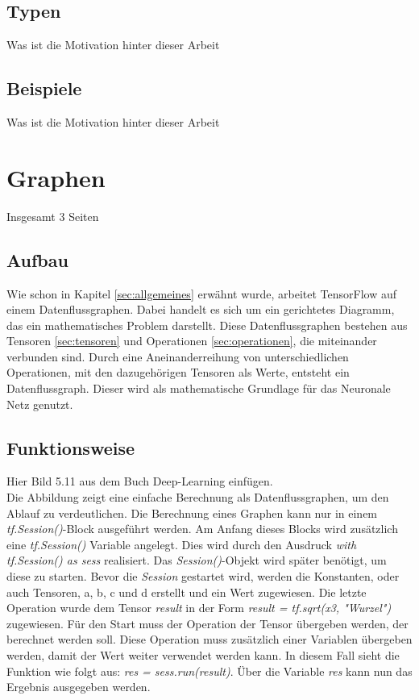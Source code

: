\subsection{Typen}
\label{sec:typen}
Was ist die Motivation hinter dieser Arbeit

\subsection{Beispiele}
\label{sec:beispiele}
Was ist die Motivation hinter dieser Arbeit

\section{Graphen}
\label{sec:graphen}
\printsubchapterauthor{\authorNiklas}
Insgesamt 3 Seiten

\subsection{Aufbau}
\label{sec:graphenAufbau}

Wie schon in Kapitel \ref{sec:allgemeines} erwähnt wurde, arbeitet TensorFlow auf einem Datenflussgraphen. Dabei handelt es sich um ein gerichtetes Diagramm, das ein mathematisches Problem darstellt. Diese Datenflussgraphen bestehen aus Tensoren \ref{sec:tensoren} und Operationen \ref{sec:operationen}, die miteinander verbunden sind. Durch eine Aneinanderreihung von unterschiedlichen Operationen, mit den dazugehörigen Tensoren als Werte, entsteht ein Datenflussgraph. Dieser wird als mathematische Grundlage für das Neuronale Netz genutzt.

\subsection{Funktionsweise}
\label{sec:graphenFunktionsweise}
Hier Bild 5.11 aus dem Buch Deep-Learning einfügen.\\
Die Abbildung zeigt eine einfache Berechnung als Datenflussgraphen, um den Ablauf zu verdeutlichen. Die Berechnung eines Graphen kann nur in einem \textit{tf.Session()}-Block ausgeführt werden. Am Anfang dieses Blocks wird zusätzlich eine \textit{tf.Session()} Variable angelegt. Dies wird durch den Ausdruck \textit{with tf.Session() as sess} realisiert. Das \textit{Session()}-Objekt wird später benötigt, um diese zu starten. Bevor die \textit{Session} gestartet wird, werden die Konstanten, oder auch Tensoren, a, b, c und d erstellt und ein Wert zugewiesen. Die letzte Operation wurde dem Tensor \textit{result} in der Form \textit{result = tf.sqrt(x3, "Wurzel")} zugewiesen. Für den Start muss der Operation der Tensor übergeben werden, der berechnet werden soll. Diese Operation muss zusätzlich einer Variablen übergeben werden, damit der Wert weiter verwendet werden kann. In diesem Fall sieht die Funktion wie folgt aus: \textit{res = sess.run(result)}. Über die Variable \textit{res} kann nun das Ergebnis ausgegeben werden.

